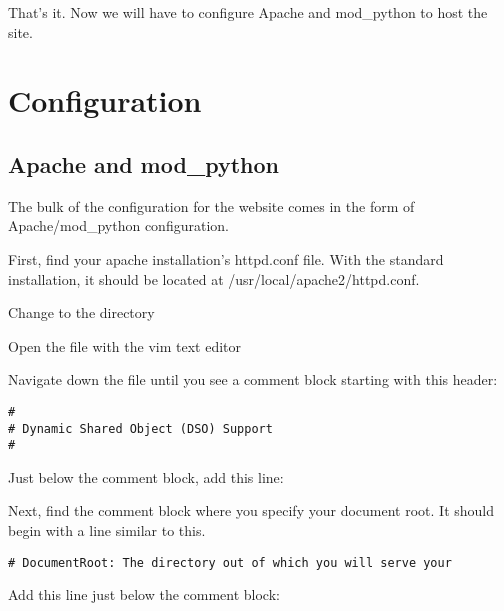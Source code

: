 That's it.  Now we will have to configure Apache and mod\_python to host the site.

\section{Configuration}

\subsection{Apache and mod\_python}
The bulk of the configuration for the website comes in the form of Apache/mod\_python configuration.

\vspace{1pc}

First, find your apache installation's httpd.conf file.  With the standard installation, it should be located at /usr/local/apache2/httpd.conf.

\vspace{1pc}

Change to the directory


\vspace{1pc}

Open the file with the vim text editor


\vspace{1pc}

Navigate down the file until you see a comment block starting with this header:

\begin{verbatim}
#
# Dynamic Shared Object (DSO) Support
#
\end{verbatim}

Just below the comment block, add this line:


\vspace{1pc}

Next, find the comment block where you specify your document root.  It should begin with a line similar to this.

\begin{verbatim}
# DocumentRoot: The directory out of which you will serve your
\end{verbatim}

Add this line just below the comment block:


